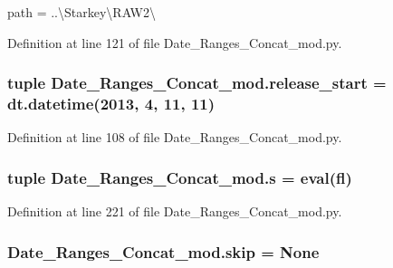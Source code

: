 path = \textquotesingle{}..\textbackslash{}Starkey\textbackslash{}R\+A\+W2\textbackslash{}\textquotesingle{} 



Definition at line 121 of file Date\+\_\+\+Ranges\+\_\+\+Concat\+\_\+mod.\+py.

\hypertarget{namespace_date___ranges___concat__mod_a9f3f490646543752529e8feb85f4910d}{}
\subsubsection[{release\+\_\+start}]{\setlength{\rightskip}{0pt plus 5cm}tuple Date\+\_\+\+Ranges\+\_\+\+Concat\+\_\+mod.\+release\+\_\+start = dt.\+datetime(2013, 4, 11, 11)}\label{namespace_date___ranges___concat__mod_a9f3f490646543752529e8feb85f4910d}


Definition at line 108 of file Date\+\_\+\+Ranges\+\_\+\+Concat\+\_\+mod.\+py.

\hypertarget{namespace_date___ranges___concat__mod_accfa90ffb586c78876af1d026419e456}{}
\subsubsection[{s}]{\setlength{\rightskip}{0pt plus 5cm}tuple Date\+\_\+\+Ranges\+\_\+\+Concat\+\_\+mod.\+s = eval(fl)}\label{namespace_date___ranges___concat__mod_accfa90ffb586c78876af1d026419e456}


Definition at line 221 of file Date\+\_\+\+Ranges\+\_\+\+Concat\+\_\+mod.\+py.

\hypertarget{namespace_date___ranges___concat__mod_ae17bce25297454c5f14191f6dac1da6e}{}
\subsubsection[{skip}]{\setlength{\rightskip}{0pt plus 5cm}Date\+\_\+\+Ranges\+\_\+\+Concat\+\_\+mod.\+skip = None}\label{namespace_date___ranges___concat__mod_ae17bce25297454c5f14191f6dac1da6e}


